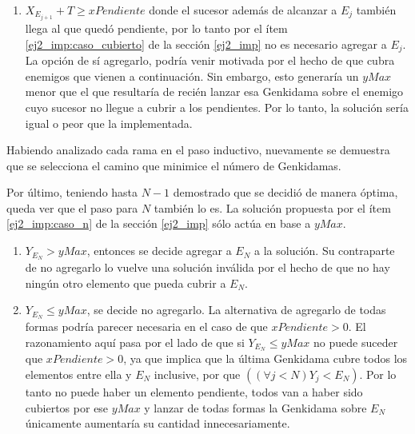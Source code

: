 \begin{enumerate}
{\begin{enumerate}
{\begin{enumerate}
{\begin{enumerate}
{									enemigo futuro que al eliminarlo el rango de
									su Genkidama destruya todos los que quedaron
									pendientes, haciendo esta una solución
									inválida.
								}
								\item{
									$X_{E_{j+1}} + T \geq xPendiente$ donde el
									sucesor además de alcanzar a $E_j$ también
									llega al que quedó pendiente, por lo tanto
									por el ítem \ref{ej2_imp:caso_cubierto} de
									la sección \ref{ej2_imp} no es necesario
									agregar a $E_j$. La opción de sí agregarlo,
									podría venir motivada por el hecho de que
									cubra enemigos que vienen a continuación.
									Sin embargo, esto generaría un $yMax$ menor
									que el que resultaría de recién lanzar esa
									Genkidama sobre el enemigo cuyo sucesor no llegue a
									cubrir a los pendientes. Por lo tanto, la
									solución sería igual o peor que la
									implementada.
								}
							\end{enumerate}
						}
					\end{enumerate}
				}
			\end{enumerate}

			Habiendo analizado cada rama en el paso inductivo, nuevamente se
			demuestra que se selecciona el camino que minimice el número de
			Genkidamas.

			Por último, teniendo hasta $N - 1$ demostrado que se decidió de
			manera óptima, queda ver que el paso para $N$ también lo es. La
			solución propuesta por el ítem \ref{ej2_imp:caso_n} de la sección
			\ref{ej2_imp} sólo actúa en base a $yMax$.

			\begin{enumerate}
				\item{
					$Y_{E_N} > yMax$, entonces se decide agregar a $E_N$ a la
					solución. Su contraparte de no agregarlo lo vuelve una
					solución inválida por el hecho de que no hay ningún otro
					elemento que pueda cubrir a $E_N$.
				}
				\item{
					$Y_{E_N} \leq yMax$, se decide no agregarlo. La alternativa de
					agregarlo de todas formas podría parecer necesaria en el
					caso de que $xPendiente > 0$. El razonamiento aquí pasa por
					el lado de que si $Y_{E_N} \leq yMax$ no puede suceder que
					$xPendiente >0$, ya que implica que la última Genkidama
					cubre todos los elementos entre ella y $E_N$ inclusive, por
					que $((\forall j < N) Y_j < E_N)$. Por lo tanto no puede
					haber un elemento pendiente, todos van a haber sido
					cubiertos por ese $yMax$ y lanzar de todas formas la
					Genkidama sobre $E_N$ únicamente aumentaría su cantidad
					innecesariamente.
				}
			\end{enumerate}
		}
	\end{enumerate}

